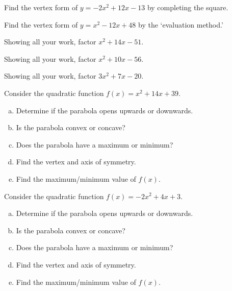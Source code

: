\documentclass[11pt,letterpaper]{article}
\begin{document}
 Find the vertex form of $y= -2x^2 + 12x - 13$ by completing the square. \pspace



\newpage



 Find the vertex form of $y= x^2 - 12x + 48$ by the `evaluation method.' \pspace 



\newpage



 Showing all your work, factor $x^2 + 14x - 51$. \pspace



\newpage



 Showing all your work, factor $x^2 + 10x - 56$. \pspace



\newpage



 Showing all your work, factor $3x^2 + 7x - 20$. \pspace



\newpage



 Consider the quadratic function $f(x)= x^2 + 14x + 39$.
        \begin{enumerate}[(a)]
        \item Determine if the parabola opens upwards or downwards.
        \item Is the parabola convex or concave?
        \item Does the parabola have a maximum or minimum? 
        \item Find the vertex and axis of symmetry. 
        \item Find the maximum/minimum value of $f(x)$. 
        \end{enumerate} \pspace



\newpage



 Consider the quadratic function $f(x)= -2x^2 + 4x + 3$.
        \begin{enumerate}[(a)]
        \item Determine if the parabola opens upwards or downwards.
        \item Is the parabola convex or concave?
        \item Does the parabola have a maximum or minimum? 
        \item Find the vertex and axis of symmetry. 
        \item Find the maximum/minimum value of $f(x)$. 
        \end{enumerate} \pspace
\end{document}

